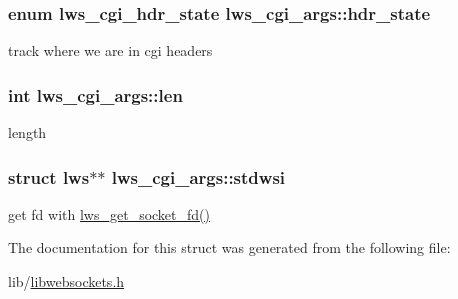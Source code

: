 \subsubsection[{\texorpdfstring{hdr\+\_\+state}{hdr\_state}}]{\setlength{\rightskip}{0pt plus 5cm}enum lws\+\_\+cgi\+\_\+hdr\+\_\+state lws\+\_\+cgi\+\_\+args\+::hdr\+\_\+state}\hypertarget{structlws__cgi__args_a741c11b9aa05997ec45a3400d7fb7739}{}\label{structlws__cgi__args_a741c11b9aa05997ec45a3400d7fb7739}
track where we are in cgi headers 
\subsubsection[{\texorpdfstring{len}{len}}]{\setlength{\rightskip}{0pt plus 5cm}int lws\+\_\+cgi\+\_\+args\+::len}\hypertarget{structlws__cgi__args_a36e5c256433c187bd0eaa9c1ca667f1d}{}\label{structlws__cgi__args_a36e5c256433c187bd0eaa9c1ca667f1d}
length 
\subsubsection[{\texorpdfstring{stdwsi}{stdwsi}}]{\setlength{\rightskip}{0pt plus 5cm}struct lws$\ast$$\ast$ lws\+\_\+cgi\+\_\+args\+::stdwsi}\hypertarget{structlws__cgi__args_a4ccc1058e7e914a26eef31ab2ad46aa1}{}\label{structlws__cgi__args_a4ccc1058e7e914a26eef31ab2ad46aa1}
get fd with \hyperlink{group__callback-when-writeable_gaa709e02a10558753c851e58f1e2c16ba}{lws\+\_\+get\+\_\+socket\+\_\+fd()} 

The documentation for this struct was generated from the following file\+:\begin{DoxyCompactItemize}
\item 
lib/\hyperlink{libwebsockets_8h}{libwebsockets.\+h}\end{DoxyCompactItemize}
